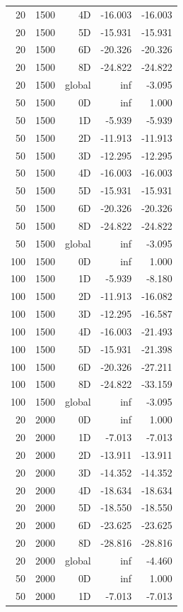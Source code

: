\begin{longtable}{rrrrr}
20 & 1500 & 4D & -16.003 & -16.003 \\
20 & 1500 & 5D & -15.931 & -15.931 \\
20 & 1500 & 6D & -20.326 & -20.326 \\
20 & 1500 & 8D & -24.822 & -24.822 \\
20 & 1500 & global & inf & -3.095 \\
50 & 1500 & 0D & inf & 1.000 \\
50 & 1500 & 1D & -5.939 & -5.939 \\
50 & 1500 & 2D & -11.913 & -11.913 \\
50 & 1500 & 3D & -12.295 & -12.295 \\
50 & 1500 & 4D & -16.003 & -16.003 \\
50 & 1500 & 5D & -15.931 & -15.931 \\
50 & 1500 & 6D & -20.326 & -20.326 \\
50 & 1500 & 8D & -24.822 & -24.822 \\
50 & 1500 & global & inf & -3.095 \\
100 & 1500 & 0D & inf & 1.000 \\
100 & 1500 & 1D & -5.939 & -8.180 \\
100 & 1500 & 2D & -11.913 & -16.082 \\
100 & 1500 & 3D & -12.295 & -16.587 \\
100 & 1500 & 4D & -16.003 & -21.493 \\
100 & 1500 & 5D & -15.931 & -21.398 \\
100 & 1500 & 6D & -20.326 & -27.211 \\
100 & 1500 & 8D & -24.822 & -33.159 \\
100 & 1500 & global & inf & -3.095 \\
20 & 2000 & 0D & inf & 1.000 \\
20 & 2000 & 1D & -7.013 & -7.013 \\
20 & 2000 & 2D & -13.911 & -13.911 \\
20 & 2000 & 3D & -14.352 & -14.352 \\
20 & 2000 & 4D & -18.634 & -18.634 \\
20 & 2000 & 5D & -18.550 & -18.550 \\
20 & 2000 & 6D & -23.625 & -23.625 \\
20 & 2000 & 8D & -28.816 & -28.816 \\
20 & 2000 & global & inf & -4.460 \\
50 & 2000 & 0D & inf & 1.000 \\
50 & 2000 & 1D & -7.013 & -7.013 \\

\end{longtable}
